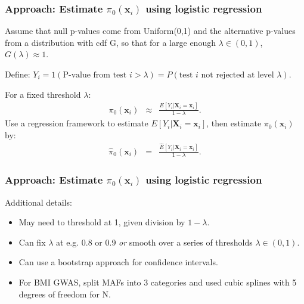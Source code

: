 \documentclass{beamer}
\newcommand{\bX}{\mathbf{X}}
\newcommand{\bx}{\mathbf{x}}
\begin{document}

\begin{frame}
\frametitle{Approach: Estimate $\pi_0(\bx_i)$ using logistic regression}

Assume that null p-values come from Uniform(0,1) and the alternative p-values from a distribution with cdf G,
so that for a large enough $\lambda \in (0,1)$, $G(\lambda) \approx 1$.

\vspace{0.5cm}
Define: $Y_i = 1(\mbox{P-value from test $i > \lambda$}) = P(\mbox{test $i$ not rejected at level $\lambda$})$.

\vspace{0.5cm}
For a fixed threshold $\lambda$:
\begin{eqnarray*}
\pi_0(\bx_i) &\approx& \frac{E[Y_i|\bX_i=\bx_i] }{1-\lambda}.
\end{eqnarray*}
Use a regression framework to estimate $E[Y_i|\bX_i=\bx_i]$, then estimate
$\pi_0(\bx_i)$ by:
\begin{eqnarray*}
\label{eq:est-pio-x}
\hat{\pi}_0(\bx_i) &=& \frac{\hat{E}[Y_i|\bX_i=\bx_i] }{1-\lambda}.
\end{eqnarray*}

\end{frame}


\begin{frame}
\frametitle{Approach: Estimate $\pi_0(\bx_i)$ using logistic regression}

Additional details:

\begin{itemize}
\item May need to threshold at 1, given division by $1-\lambda$.
\item Can fix $\lambda$ at e.g. 0.8 or 0.9 \textit{or} smooth over a series of thresholds $\lambda \in (0,1)$.
\item Can use a bootstrap approach for confidence intervals.
\item For BMI GWAS, split MAFs into 3 categories and used cubic splines with 5 degrees of freedom for N.
\end{itemize}

\end{frame}

\end{document}
